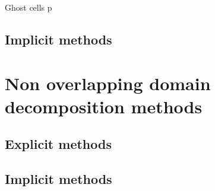 \documentclass[compress,10pt,aspectratio=169]{beamer}
\begin{document}
\begin{frame}[fragile]{Ghost cells}
p
\end{frame}

\subsection{Implicit methods}

\section{Non overlapping domain decomposition methods}

\subsection{Explicit methods}

\subsection{Implicit methods}
\end{document}
